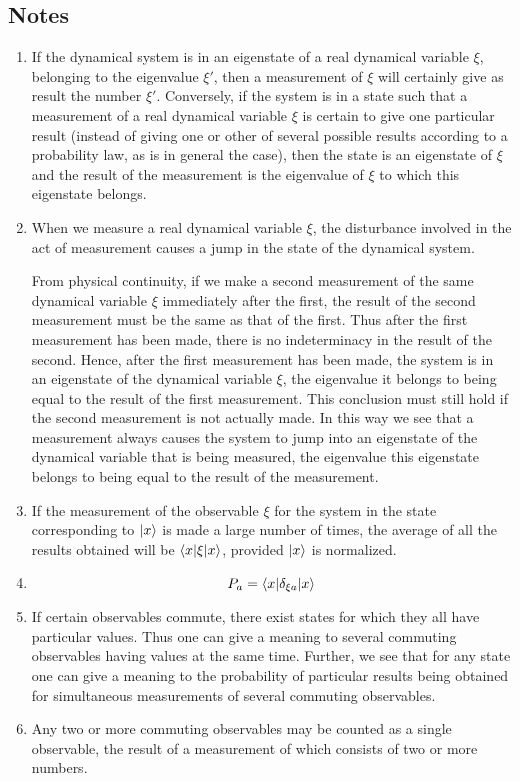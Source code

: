 \subsection{Notes}
\begin{enumerate}
\item If the dynamical system is in an eigenstate of a real dynamical variable $\xi$, belonging to the eigenvalue $\xi'$, then a measurement of $\xi$ will certainly give as result the number $\xi'$. Conversely, if the system is in a state such that a measurement of a real dynamical variable $\xi$ is certain to give one particular result (instead of giving one or other of several possible results according to a probability law, as is in general the case), then the state is an eigenstate of $\xi$ and the result of the measurement is the eigenvalue of $\xi$ to which this eigenstate belongs.

\item When we measure a real dynamical variable $\xi$, the disturbance involved in the act of measurement causes a jump in the state of the dynamical system. 

From physical continuity, if we make a second measurement of the same dynamical variable $\xi$ immediately after the first, the result of the second measurement must be the same as that of the first. Thus after the first measurement has been made, there is no indeterminacy in the result of the second. Hence, after the first measurement has been made, the system is in an eigenstate of the dynamical variable $\xi$, the eigenvalue it belongs to being equal to the result of the first measurement. This conclusion must still hold if the second measurement is not actually made. In this way we see that a measurement always causes the system to jump into an eigenstate of the dynamical variable that is being measured, the eigenvalue this eigenstate belongs to being equal to the result of the measurement.

\item If the measurement of the observable $\xi$ for the system in the state corresponding to $| x \rangle$ is made a large number of times, the average of all the results obtained will be $\langle x | \xi | x \rangle$, provided $| x \rangle$ is normalized.

\item
\begin{equation}
P_a = \langle x | \delta_{\xi a} | x \rangle
\end{equation}

\item
If certain observables commute, there exist states for which they all have particular values. Thus one can give a meaning to several commuting observables having values at the same time. Further, we see that for any state one can give a meaning to the probability of particular results being obtained for simultaneous measurements of several commuting observables.

\item Any two or more commuting observables may be counted as a single observable, the result of a measurement of which consists of two or more numbers.
\end{enumerate}

